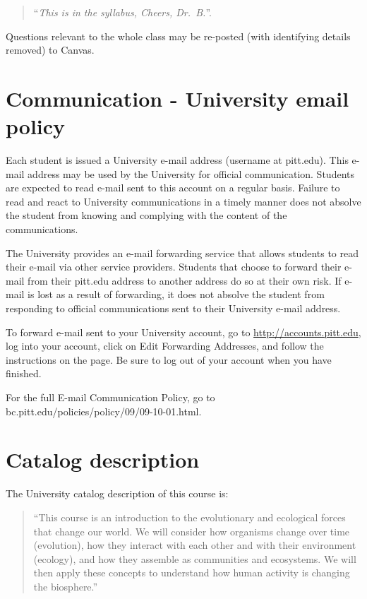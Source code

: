 \documentclass[
]{book}
\begin{document}
\begin{quote}
``\emph{This is in the syllabus, Cheers, Dr.~B.}''.
\end{quote}

Questions relevant to the whole class may be re-posted (with identifying details removed) to Canvas.

\hypertarget{communication---university-email-policy}{%
\chapter{Communication - University email policy}\label{communication---university-email-policy}}

Each student is issued a University e-mail address (username at pitt.edu). This e-mail address may be used by the University for official communication. Students are expected to read e-mail sent to this account on a regular basis. Failure to read and react to University communications in a timely manner does not absolve the student from knowing and complying with the content of the communications.

The University provides an e-mail forwarding service that allows students to read their e-mail via other service providers. Students that choose to forward their e-mail from their pitt.edu address to another address do so at their own risk. If e-mail is lost as a result of forwarding, it does not absolve the student from responding to official communications sent to their University e-mail address.

To forward e-mail sent to your University account, go to \url{http://accounts.pitt.edu}, log into your account, click on Edit Forwarding Addresses, and follow the instructions on the page. Be sure to log out of your account when you have finished.

For the full E-mail Communication Policy, go to bc.pitt.edu/policies/policy/09/09-10-01.html.

\hypertarget{catalog-description}{%
\chapter{Catalog description}\label{catalog-description}}

The University catalog description of this course is:

\begin{quote}
``This course is an introduction to the evolutionary and ecological forces that change our world. We will consider how organisms change over time (evolution), how they interact with each other and with their environment (ecology), and how they assemble as communities and ecosystems. We will then apply these concepts to understand how human activity is changing the biosphere.''
\end{quote}
\end{document}
